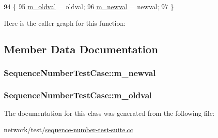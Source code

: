 \begin{DoxyCode}
94 \{
95   \hyperlink{classSequenceNumberTestCase_a508cbf71bf152086776cefc6816ce98b}{m\_oldval} = oldval;
96   \hyperlink{classSequenceNumberTestCase_a85d954722c4fabd7278e49869765b94c}{m\_newval} = newval;
97 \}
\end{DoxyCode}


Here is the caller graph for this function\+:




\subsection{Member Data Documentation}
\subsubsection[{\texorpdfstring{m\+\_\+newval}{m_newval}}]{ Sequence\+Number\+Test\+Case\+::m\+\_\+newval\hspace{0.3cm}{\ttfamily [private]}}\hypertarget{classSequenceNumberTestCase_a85d954722c4fabd7278e49869765b94c}{}\label{classSequenceNumberTestCase_a85d954722c4fabd7278e49869765b94c}
\subsubsection[{\texorpdfstring{m\+\_\+oldval}{m_oldval}}]{ Sequence\+Number\+Test\+Case\+::m\+\_\+oldval\hspace{0.3cm}{\ttfamily [private]}}\hypertarget{classSequenceNumberTestCase_a508cbf71bf152086776cefc6816ce98b}{}\label{classSequenceNumberTestCase_a508cbf71bf152086776cefc6816ce98b}


The documentation for this class was generated from the following file\+:\begin{DoxyCompactItemize}
\item 
network/test/\hyperlink{sequence-number-test-suite_8cc}{sequence-\/number-\/test-\/suite.\+cc}\end{DoxyCompactItemize}
